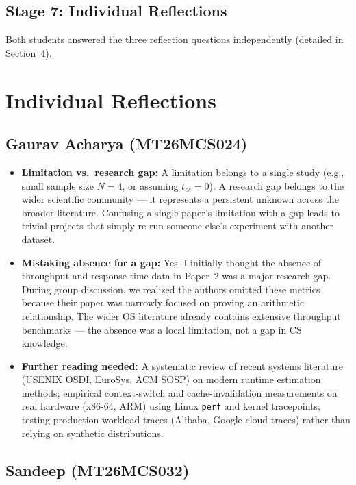 \documentclass[11pt, a4paper]{article}
\begin{document}
\subsection{Stage 7: Individual Reflections}
Both students answered the three reflection questions independently (detailed in Section~4).

\section{Individual Reflections}

\subsection{Gaurav Acharya (MT26MCS024)}

\begin{itemize}[nosep]
    \item \textbf{Limitation vs.\ research gap:} A limitation belongs to a single study (e.g., small sample size $N=4$, or assuming $t_{cs}=0$). A research gap belongs to the wider scientific community --- it represents a persistent unknown across the broader literature. Confusing a single paper's limitation with a gap leads to trivial projects that simply re-run someone else's experiment with another dataset.

    \item \textbf{Mistaking absence for a gap:} Yes. I initially thought the absence of throughput and response time data in Paper~2 was a major research gap. During group discussion, we realized the authors omitted these metrics because their paper was narrowly focused on proving an arithmetic relationship. The wider OS literature already contains extensive throughput benchmarks --- the absence was a local limitation, not a gap in CS knowledge.

    \item \textbf{Further reading needed:} A systematic review of recent systems literature (USENIX OSDI, EuroSys, ACM SOSP) on modern runtime estimation methods; empirical context-switch and cache-invalidation measurements on real hardware (x86-64, ARM) using Linux \texttt{perf} and kernel tracepoints; testing production workload traces (Alibaba, Google cloud traces) rather than relying on synthetic distributions.
\end{itemize}

\subsection{Sandeep (MT26MCS032)}
\end{document}
